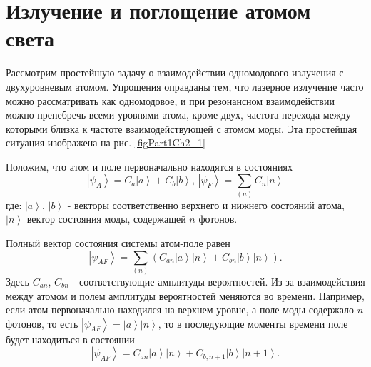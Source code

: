 \section{Излучение и поглощение атомом света}
Рассмотрим простейшую задачу о взаимодействии одномодового излучения с
двухуровневым атомом. Упрощения оправданы тем, что лазерное излучение
часто можно рассматривать как одномодовое, и при резонансном
взаимодействии можно пренебречь всеми уровнями атома, кроме двух,
частота перехода между которыми близка к частоте взаимодействующей с
атомом моды. Эта простейшая ситуация изображена на рис. \ref{figPart1Ch2_1}



Положим, что атом и поле первоначально находятся в состояниях
\begin{equation}
\left|\psi_A\right> = C_a\left|a\right> + C_b\left|b\right>, \,
\left|\psi_F\right> = \sum_{(n)}C_n\left|n\right>
\end{equation}
где:  $\left|a\right>$, $\left|b\right>$ - векторы соответственно
верхнего и нижнего состояний атома, $\left|n\right>$ вектор состояния
моды, содержащей  $n$  фотонов.
  
Полный вектор состояния системы атом-поле равен
\begin{equation}
\left|\psi_{AF}\right> = \sum_{(n)} 
\left(
C_{an}\left|a\right>\left|n\right> + 
C_{bn}\left|b\right>\left|n\right>
\right).
\end{equation}
Здесь $C_{an}$, $C_{bn}$ - соответствующие амплитуды
вероятностей. Из-за взаимодействия между атомом и полем
амплитуды вероятностей меняются во времени. Например, если
атом первоначально находился на верхнем уровне, а поле моды
содержало  $n$  фотонов, то есть  
$\left|\psi_{AF}\right> = \left|a\right>\left|n\right>$,
то в последующие моменты времени поле будет находиться в состоянии  
\begin{equation}
\left|\psi_{AF}\right> =
C_{an}\left|a\right>\left|n\right> + 
C_{b,n + 1}\left|b\right>\left|n + 1\right>.
\label{eq:part1:rabi_solution}
\end{equation}

